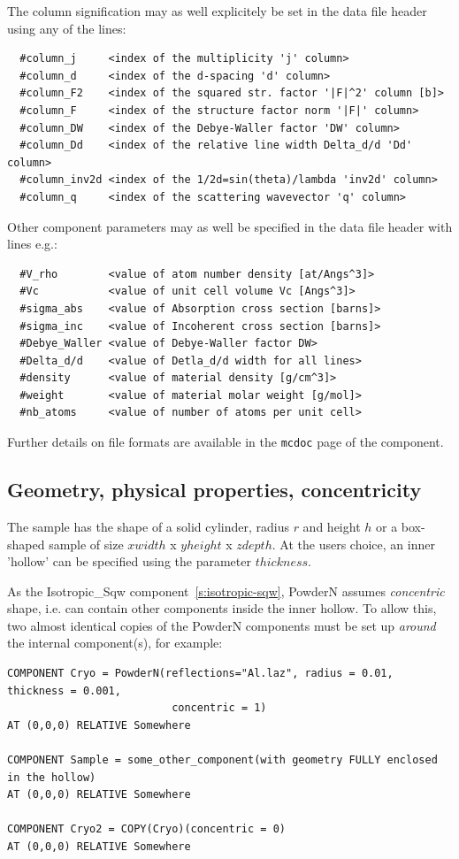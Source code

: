 The column signification may as well explicitely be set in the data file header using any of the lines:
\begin{lstlisting}
  #column_j     <index of the multiplicity 'j' column>
  #column_d     <index of the d-spacing 'd' column>
  #column_F2    <index of the squared str. factor '|F|^2' column [b]>
  #column_F     <index of the structure factor norm '|F|' column>
  #column_DW    <index of the Debye-Waller factor 'DW' column>
  #column_Dd    <index of the relative line width Delta_d/d 'Dd' column>
  #column_inv2d <index of the 1/2d=sin(theta)/lambda 'inv2d' column>
  #column_q     <index of the scattering wavevector 'q' column>
\end{lstlisting}

Other component parameters may as well be specified in the data file
header with lines e.g.:
\begin{lstlisting}
  #V_rho        <value of atom number density [at/Angs^3]>
  #Vc           <value of unit cell volume Vc [Angs^3]>
  #sigma_abs    <value of Absorption cross section [barns]>
  #sigma_inc    <value of Incoherent cross section [barns]>
  #Debye_Waller <value of Debye-Waller factor DW>
  #Delta_d/d    <value of Detla_d/d width for all lines>
  #density      <value of material density [g/cm^3]>
  #weight       <value of material molar weight [g/mol]>
  #nb_atoms     <value of number of atoms per unit cell>
\end{lstlisting}

Further details on file formats are available in the \verb+mcdoc+ page
of the component.

\subsection{Geometry, physical properties, concentricity}
The sample has the shape of a solid cylinder, radius $r$ and height $h$ or a box-shaped
sample of size $xwidth$ x $yheight$ x $zdepth$. At the users choice, an inner 'hollow' can be
specified using the parameter $thickness$. 


As the Isotropic\_Sqw component~\ref{s:isotropic-sqw}, PowderN assumes \emph{concentric} shape, i.e.
can contain other components inside the inner hollow. To allow this, two almost identical copies
of the PowderN components must be set up \emph{around} the internal component(s), for example:


\begin{lstlisting}
COMPONENT Cryo = PowderN(reflections="Al.laz", radius = 0.01, thickness = 0.001,
                          concentric = 1)
AT (0,0,0) RELATIVE Somewhere

COMPONENT Sample = some_other_component(with geometry FULLY enclosed in the hollow)
AT (0,0,0) RELATIVE Somewhere

COMPONENT Cryo2 = COPY(Cryo)(concentric = 0)
AT (0,0,0) RELATIVE Somewhere
\end{lstlisting}

